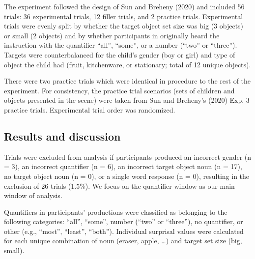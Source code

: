 \documentclass[10pt,letterpaper]{article}
\begin{document}
The experiment followed the design of Sun and Breheny (2020) and included 56 trials: 36 experimental trials, 12 filler trials, and 2 practice trials. Experimental trials were evenly split by whether  the target object set size was big (3 objects) or small (2 objects) and by whether participants in  originally heard the instruction with the quantifier ``all'', ``some'', or a number (``two'' or ``three''). Targets were counterbalanced for the child's gender (boy or girl) and type of object the child had (fruit, kitchenware, or stationary; total of 12 unique objects).  

There were two practice trials which were identical in procedure to the rest of the experiment. For consistency, the practice trial scenarios (sets of children and objects presented in the scene) were taken from Sun and Breheny's (2020) Exp. 3 practice trials. Experimental trial order was randomized.



\subsection{Results and discussion}


Trials were excluded from analysis if participants produced  an incorrect gender (n = 3),  an incorrect quantifier (n = 6), an incorrect target object noun (n = 17), no target object noun (n = 0), or a single word response (n = 0), resulting in the exclusion of  26 trials (1.5\%). We focus on the quantifier window as our main window of analysis.

Quantifiers in participants' productions were classified as belonging to the following categories: ``all'', ``some'', number (``two'' or ``three''), no quantifier, or other (e.g., ``most'', ``least'', ``both''). Individual surprisal values were calculated for each unique combination of noun (eraser, apple, \dots) and target set size (big, small).
\end{document}
